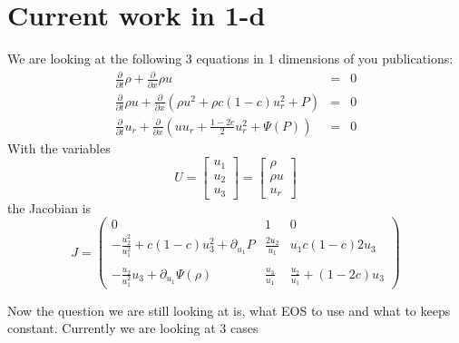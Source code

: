 \documentclass{article}
\begin{document}
 

\section{Current work in 1-d}
We are looking at the following 3 equations in 1 dimensions of you
publications:
\begin{eqnarray}
\frac{\partial}{\partial t}\rho + \frac{\partial}{\partial x} \rho u
&=&  0\label{eq:dia_2009_k}\\
\frac{\partial}{\partial t} \rho u + \frac{\partial}{\partial x} (
\rho u^2 + \rho c (1-c) u_r^2 + P)&=& 0 \label{eq:dia_2009_i}\\
\frac{\partial}{\partial t} u_r + \frac{\partial}{\partial x} (
uu_r + \frac{1-2c}{2} u_r^2 + \Psi(P)) &=& 0 \label{eq:dia_2009_r}
\end{eqnarray}
With the variables
\[
U = \left[\begin{array}{c}u_1 \\ u_2 \\ u_3\end{array}\right]
=  \left[\begin{array}{c}\rho \\ \rho u \\ u_r\end{array}\right]
\]
the Jacobian is
\begin{equation}
J = \left(\begin{array}{ccc} 0 & 1 & 0\\ - \frac{u_2^2}{u_1^2} + c
  (1-c) u_3^2 + \partial_{u_1} P & \frac{2 u_2}{u_1} & u_1 c (1-c) 2
  u_3 \\ \\ - \frac{u_2}{u_1^2} u_3 + \partial_{u_1} \Psi(\rho) &
  \frac{u_3}{u_1} & \frac{u_2}{u_1} + (1-2c) u_3
\end{array}\right)\label{eq:jacobi_general}
\end{equation}

Now the question we are still looking at is, what EOS to use and what
to keeps constant. Currently we are looking at 3 cases
\end{document}
